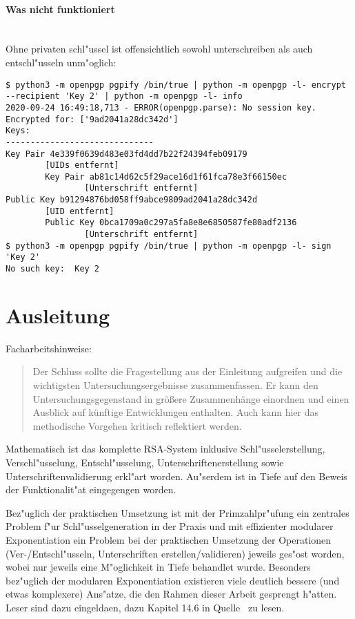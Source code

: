 \documentclass[12pt]{article}
\begin{document}
\paragraph{Was nicht funktioniert}~\\
Ohne privaten schl"ussel ist offensichtlich sowohl unterschreiben als auch entschl"usseln unm"oglich:
\begin{lstlisting}
$ python3 -m openpgp pgpify /bin/true | python -m openpgp -l- encrypt --recipient 'Key 2' | python -m openpgp -l- info
2020-09-24 16:49:18,713 - ERROR(openpgp.parse): No session key. Encrypted for: ['9ad2041a28dc342d']
Keys:
------------------------------
Key Pair 4e339f0639d483e03fd4dd7b22f24394feb09179
        [UIDs entfernt]
        Key Pair ab81c14d62c5f29ace16d1f61fca78e3f66150ec
                [Unterschrift entfernt]
Public Key b91294876bd058ff9abce9809ad2041a28dc342d
        [UID entfernt]
        Public Key 0bca1709a0c297a5fa8e8e6850587fe80adf2136
                [Unterschrift entfernt]
$ python3 -m openpgp pgpify /bin/true | python -m openpgp -l- sign 'Key 2'
No such key:  Key 2
\end{lstlisting}

\section{Ausleitung}
Facharbeitshinweise:
\begin{quote}
Der Schluss sollte die Fragestellung aus der Einleitung aufgreifen und die wichtigsten Untersuchungsergebnisse zusammenfassen. Er kann den Untersuchungsgegenstand in größere Zusammenhänge einordnen und einen Ausblick auf künftige Entwicklungen enthalten. Auch kann hier das methodische Vorgehen kritisch reflektiert werden.
\end{quote}

Mathematisch ist das komplette RSA-System inklusive Schl"usselerstellung, Verschl"usselung,
Entschl"usselung, Unterschriftenerstellung sowie Unterschriftenvalidierung erkl"art worden.
Au"serdem ist in Tiefe auf den Beweis der Funktionalit"at eingegengen worden.

Bez"uglich der praktischen Umsetzung ist mit der Primzahlpr"ufung ein zentrales
Problem f"ur Schl"usselgeneration in der Praxis und mit effizienter modularer Exponentiation
ein Problem bei der praktischen Umsetzung der Operationen (Ver-/Entschl"usseln, Unterschriften erstellen/validieren)
jeweils ges"ost worden, wobei nur jeweils eine M"oglichkeit in Tiefe behandlet wurde.
Besonders bez"uglich der modularen Exponentiation existieren viele deutlich bessere (und etwas komplexere)
Ans"atze, die den Rahmen dieser Arbeit gesprengt h"atten.
Leser sind dazu eingeldaen, dazu Kapitel 14.6 in Quelle~\cite{hac} zu lesen.
\end{document}
